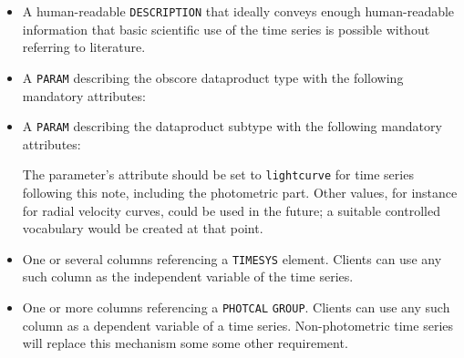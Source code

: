 \documentclass[11pt,a4paper]{ivoa}
\let\fg=\color
\def\attr#1{{\tt{\fg{DarkRed}#1}}}
\def\elem#1{{\tt{\fg{DarkRed}#1}}}
\def\attrval#1#2{{\tt{\fg{DarkRed}#1}="{\fg{DarkPurple}#2}"}}
\begin{document}
\begin{itemize}
\item A human-readable \attr{DESCRIPTION} that ideally conveys enough
human-readable information that basic scientific use of the time series
is possible without referring to literature.

\item A \elem{PARAM} describing the obscore dataproduct type with the 
following mandatory attributes:

\item A \elem{PARAM} describing the dataproduct subtype with the
following mandatory attributes:


The parameter's  attribute should be set to
\texttt{lightcurve} for time series following this note, including the
photometric part.  Other values, for instance for radial velocity
curves, could be used in the future; a suitable controlled vocabulary
would be created at that point.

     \item One or several columns referencing a \elem{TIMESYS} element.
     Clients can use any such column as the independent variable of the
     time series.

     \item One or more columns referencing a \texttt{PHOTCAL}
     \elem{GROUP}.  Clients can use any such column as a dependent
     variable of a time series.  Non-photometric time series will
     replace this mechanism some some other requirement.
\end{itemize}
\end{document}
